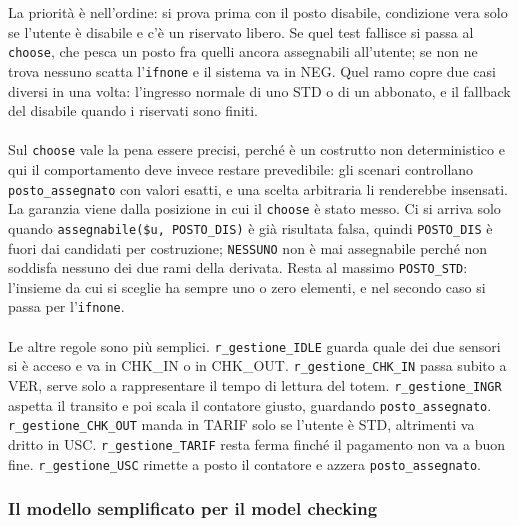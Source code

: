 La priorità è nell'ordine: si prova prima con il posto disabile, condizione vera solo se
l'utente è disabile e c'è un riservato libero. Se quel test fallisce si passa al
\texttt{choose}, che pesca un posto fra quelli ancora assegnabili all'utente; se non ne
trova nessuno scatta l'\texttt{ifnone} e il sistema va in NEG. Quel ramo copre due casi
diversi in una volta: l'ingresso normale di uno STD o di un abbonato, e il fallback del
disabile quando i riservati sono finiti.
\\ \\
Sul \texttt{choose} vale la pena essere precisi, perché è un costrutto non deterministico
e qui il comportamento deve invece restare prevedibile: gli scenari controllano
\texttt{posto\_assegnato} con valori esatti, e una scelta arbitraria li renderebbe
insensati. La garanzia viene dalla posizione in cui il \texttt{choose} è stato messo. Ci
si arriva solo quando \texttt{assegnabile(\$u, POSTO\_DIS)} è già risultata falsa, quindi
\texttt{POSTO\_DIS} è fuori dai candidati per costruzione; \texttt{NESSUNO} non è mai
assegnabile perché non soddisfa nessuno dei due rami della derivata. Resta al massimo
\texttt{POSTO\_STD}: l'insieme da cui si sceglie ha sempre uno o zero elementi, e nel
secondo caso si passa per l'\texttt{ifnone}.
\\ \\
Le altre regole sono più semplici. \texttt{r\_gestione\_IDLE} guarda quale dei due
sensori si è acceso e va in CHK\_IN o in CHK\_OUT. \texttt{r\_gestione\_CHK\_IN} passa
subito a VER, serve solo a rappresentare il tempo di lettura del totem.
\texttt{r\_gestione\_INGR} aspetta il transito e poi scala il contatore giusto, guardando
\texttt{posto\_assegnato}. \texttt{r\_gestione\_CHK\_OUT} manda in TARIF solo se l'utente
è STD, altrimenti va dritto in USC. \texttt{r\_gestione\_TARIF} resta ferma finché il
pagamento non va a buon fine. \texttt{r\_gestione\_USC} rimette a posto il contatore e
azzera \texttt{posto\_assegnato}.

\subsubsection{Il modello semplificato per il model checking}

